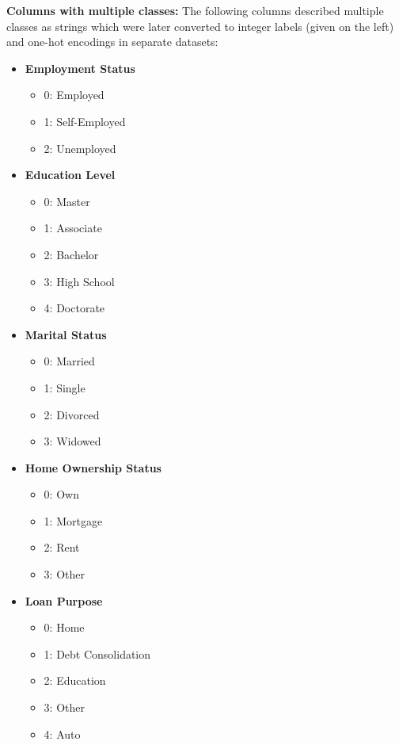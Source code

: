 \documentclass[12pt]{report}
\begin{document}
{}
\noindent\textbf{Columns with multiple classes:}
The following columns described multiple classes as strings which were later converted to integer labels (given on the left) and one-hot encodings in separate datasets:
\begin{itemize}
    \item \textbf{Employment Status}
    \begin{itemize}
        \item 0: Employed
        \item 1: Self-Employed
        \item 2: Unemployed
    \end{itemize}
    \item \textbf{Education Level}
    \begin{itemize}
        \item 0: Master
        \item 1: Associate
        \item 2: Bachelor
        \item 3: High School
        \item 4: Doctorate
    \end{itemize}
    \item \textbf{Marital Status}
    \begin{itemize}
        \item 0: Married
        \item 1: Single
        \item 2: Divorced
        \item 3: Widowed
    \end{itemize}
    \item \textbf{Home Ownership Status}
    \begin{itemize}
        \item 0: Own
        \item 1: Mortgage
        \item 2: Rent
        \item 3: Other
    \end{itemize}
    \item \textbf{Loan Purpose}
    \begin{itemize}
        \item 0: Home
        \item 1: Debt Consolidation
        \item 2: Education
        \item 3: Other
        \item 4: Auto
    \end{itemize}
\end{itemize}
\end{document}
